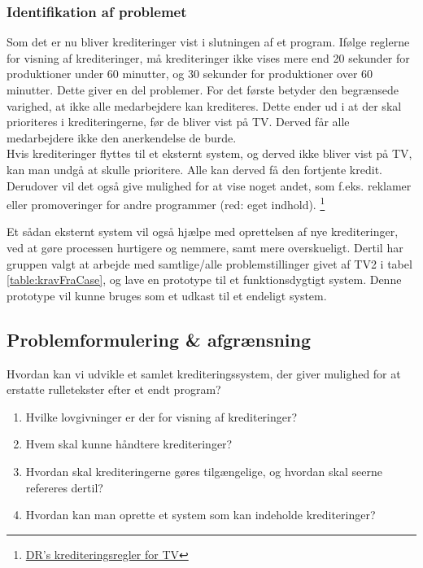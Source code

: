 \subsubsection{Identifikation af problemet}
Som det er nu bliver krediteringer vist i slutningen af et program. Ifølge reglerne for visning af krediteringer, må krediteringer ikke vises mere end 20 sekunder for produktioner under 60 minutter, og 30 sekunder for produktioner over 60 minutter. Dette giver en del problemer. For det første betyder den begrænsede varighed, at ikke alle medarbejdere kan krediteres. Dette ender ud i at der skal prioriteres i krediteringerne, før de bliver vist på TV. Derved får alle medarbejdere ikke den anerkendelse de burde.\\
Hvis krediteringer flyttes til et eksternt system, og derved ikke bliver vist på TV, kan man undgå at skulle prioritere. Alle kan derved få den fortjente kredit. Derudover vil det også give mulighed for at vise noget andet, som f.eks. reklamer eller promoveringer for andre programmer (red: eget indhold).
\footnote{\href{https://www.dr.dk/NR/rdonlyres/00221a7b/dpikscstjptklixxdnjgywgeuakhwpog/DR_kreditmanual_050810.pdf}{DR’s krediteringsregler for TV}}

\noindent
Et sådan eksternt system vil også hjælpe med oprettelsen af nye krediteringer, ved at gøre processen hurtigere og nemmere, samt mere overskueligt. Dertil har gruppen valgt at arbejde med samtlige/alle problemstillinger givet af TV2 i tabel \ref{table:kravFraCase}, og lave en prototype til et funktionsdygtigt system. Denne prototype vil kunne bruges som et udkast til et endeligt system.

\subsection{Problemformulering \& afgrænsning}
Hvordan kan vi udvikle et samlet krediteringssystem, der giver mulighed for at erstatte rulletekster efter et endt program?

\begin{enumerate}
    \item Hvilke lovgivninger er der for visning af krediteringer?
    \item Hvem skal kunne håndtere krediteringer?
    \item Hvordan skal krediteringerne gøres tilgængelige, og hvordan skal seerne refereres dertil?
    \item Hvordan kan man oprette et system som kan indeholde krediteringer?
\end{enumerate}

